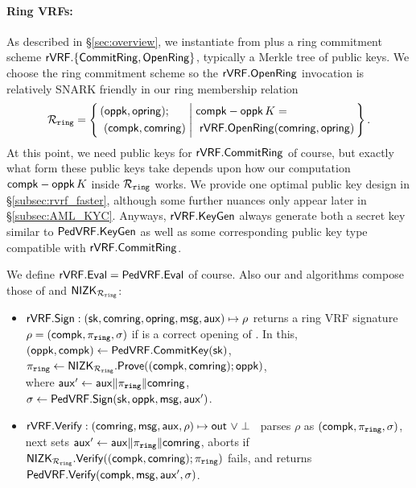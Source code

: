 \paragraph{Ring VRFs:}
As described in \S\ref{sec:overview},
we instantiate \rVRF from \PedVRF plus a ring commitment scheme
 ${\mathsf{rVRF}}.\{ {\mathsf{CommitRing}}, {\mathsf{OpenRing}} \}$,
typically a Merkle tree of public keys.
We choose the ring commitment scheme so the ${\mathsf{rVRF}}.{\mathsf{OpenRing}}$ invocation
is relatively SNARK friendly in our ring membership relation
$$ \Rring = \Setst{ 
  \begin{aligned}
    & (\openpk, \openring); \\ 
    & \,\, (\compk,\comring) 
  \end{aligned}
}{
  \begin{aligned}
    & \compk - \openpk \, \genB = \\
    & \,\, \rVRF.\OpenRing(\comring,\openring)
  \end{aligned}
} \mathperiod $$
At this point, we need public keys for ${\mathsf{rVRF}}.{\mathsf{CommitRing}}$ of course,
but exactly what form these public keys take depends upon how our computation
 $\mathsf{compk} - \mathsf{oppk} \, K$ inside $\mathcal{R}_{\mathtt{ring}}$ works.
We provide one optimal public key design in \S\ref{subsec:rvrf_faster},
 although some further nuances only appear later in \S\ref{subsec:AML_KYC}.
Anyways, ${\mathsf{rVRF}}.{\mathsf{KeyGen}}$ always generate both a secret key similar to
${\mathsf{PedVRF}}.{\mathsf{KeyGen}}$ as well as some corresponding public key type
 compatible with ${\mathsf{rVRF}}.{\mathsf{CommitRing}}$.

We define ${\mathsf{rVRF}}.{\mathsf{Eval}} = {\mathsf{PedVRF}}.{\mathsf{Eval}}$ of course.
Also our \Sign and \Verify algorithms compose those of \PedVRF and
 ${\mathsf{NIZK}}_{\mathcal{R}_{\mathtt{ring}}}$:
\def\tmpaux{\aux \doubleplus \piring \doubleplus \comring}
\def\tmpeprintaux{\eprint{\aux'}{\tmpaux}}
\def\tmpindent{\hspace*{5pt}}
\begin{itemize}
	\item ${\mathsf{rVRF}}.{\mathsf{Sign}} : (\mathsf{sk},\mathsf{comring}, \mathsf{opring},\mathsf{msg},\mathsf{aux}) \mapsto \rho$
	returns a ring VRF signature $\rho = (\mathsf{compk},\pi_{\mathtt{ring}},\sigma)$
	if \openring is a correct opening of \comring.  In this, 
	\tmpindent $(\mathsf{oppk},\mathsf{compk}) \leftarrow {\ensuremath{\mathsf{PedVRF}}}.{\mathsf{CommitKey}}(\mathsf{sk})$,  \\
	\tmpindent $\pi_{\mathtt{ring}} \leftarrow {\ensuremath{\mathsf{NIZK}}}_{\mathcal{R}_{\mathtt{ring}}}.{\mathsf{Prove}}((\mathsf{compk},\mathsf{comring}); \mathsf{oppk})$, \\
	where 
	\tmpindent $\aux' \leftarrow \tmpaux$,  \\
	\tmpindent $\sigma \leftarrow {\ensuremath{\mathsf{PedVRF}}}.{\mathsf{Sign}}(\mathsf{sk},\mathsf{oppk},\mathsf{msg}, \mathsf{aux}')$.

	\item ${\mathsf{rVRF}}.{\mathsf{Verify}} : (\mathsf{comring},\mathsf{msg},\mathsf{aux},\rho) \mapsto {\ensuremath{\mathsf{out}}} \,\, \lor \perp$ \,
	parses $\rho$ as $(\mathsf{compk},\pi_{\mathtt{ring}},\sigma)$, next sets $\aux' \leftarrow \tmpaux$,
	aborts if ${\mathsf{NIZK}}_{\mathcal{R}_{\mathtt{ring}}}.{\mathsf{Verify}}((\mathsf{compk},\mathsf{comring}); \pi_{\mathtt{ring}})$ fails,
	and returns ${\mathsf{PedVRF}}.{\mathsf{Verify}}(\mathsf{compk},\mathsf{msg}, \mathsf{aux}', \sigma)$.
\end{itemize}

